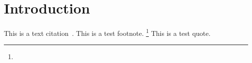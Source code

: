 \chapter{Introduction}
This is a text citation~\cite{Knight2020}.
\lipsum[1]
This is a test footnote.%
\footnote{\lipsum[3]}
\lipsum[2-3]
This is a test quote.
\begin{quote}
  \lipsum[3]
\end{quote}
\lipsum[4-5]